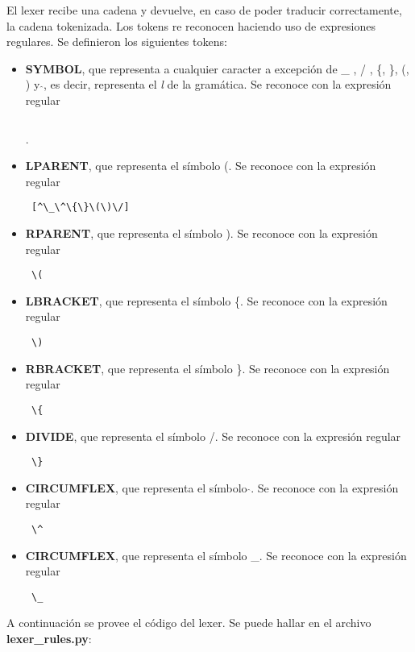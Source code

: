 \indent \indent El lexer recibe una cadena y devuelve, en caso de poder traducir correctamente, la cadena tokenizada. Los tokens re reconocen haciendo uso de expresiones regulares. Se definieron los siguientes tokens:\\
\begin{itemize}
\item \textbf{SYMBOL}, que representa a cualquier caracter a excepción de \_ , / , \{, \}, (, ) y  $\hat{}$, es decir, representa el \textit{l} de la gramática. Se reconoce con la expresión regular \begin{verbatim} \end{verbatim}.
\item \textbf{LPARENT}, que representa el símbolo (. Se reconoce con la expresión regular \begin{verbatim} [^\_\^\{\}\(\)\/]\end{verbatim}
\item \textbf{RPARENT}, que representa el símbolo ).  Se reconoce con la expresión regular \begin{verbatim} \( \end{verbatim}
\item \textbf{LBRACKET}, que representa el símbolo \{.  Se reconoce con la expresión regular \begin{verbatim} \)\end{verbatim}
\item \textbf{RBRACKET}, que representa el símbolo \}.  Se reconoce con la expresión regular \begin{verbatim} \{\end{verbatim}
\item \textbf{DIVIDE}, que representa el símbolo /.  Se reconoce con la expresión regular \begin{verbatim} \}\end{verbatim}
\item \textbf{CIRCUMFLEX}, que representa el símbolo $\hat{}$.  Se reconoce con la expresión regular \begin{verbatim} \^ \end{verbatim}
\item \textbf{CIRCUMFLEX}, que representa el símbolo \_.  Se reconoce con la expresión regular \begin{verbatim} \_ \end{verbatim}
\end{itemize}

\indent A continuación se provee el código del lexer. Se puede hallar en el archivo \textbf{lexer\_rules.py}:\\

